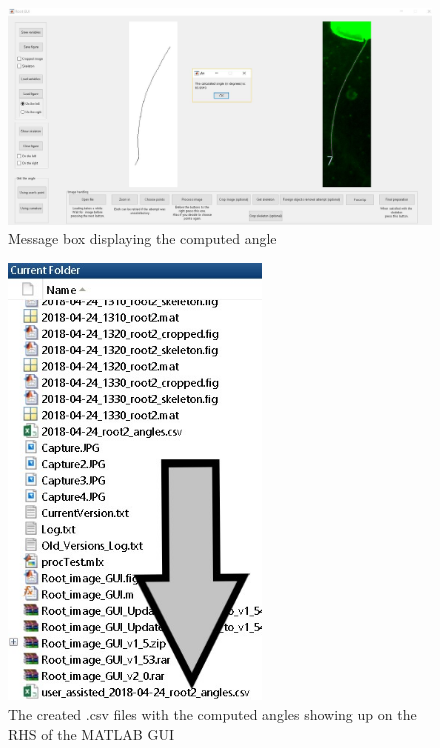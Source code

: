 \begin{figure}[H]
	\centering
	\includegraphics[width=\textwidth]{../Figures/manual/optionalE6.jpg}
	\caption{Message box displaying the computed angle}
	\label{fig:img67}
\end{figure}

\begin{figure}[H]
	\centering
	\includegraphics[width=0.6\textwidth]{../Figures/manual/optionalE7.jpg}
	\caption{The created .csv files with the computed angles showing up on the RHS of the MATLAB GUI}
	\label{fig:img68}
\end{figure}


